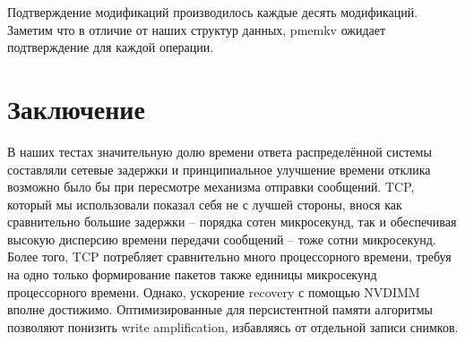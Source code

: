 \documentclass[pdftex,ptm,12pt,a4paper]{report}
\theoremstyle{definition}
\begin{document}
Подтверждение модификаций производилось каждые десять модификаций. Заметим что в отличие от наших структур данных, pmemkv ожидает подтверждение для каждой операции.

\chapter{Заключение}
В наших тестах значительную долю времени ответа распределённой системы составляли сетевые задержки и принципиальное улучшение времени отклика возможно было бы при
пересмотре механизма отправки сообщений. TCP, который мы использовали показал себя не с лучшей стороны, внося как сравнительно большие задержки -- порядка сотен микросекунд, так
и обеспечивая высокую дисперсию времени передачи сообщений -- тоже сотни микросекунд. Более того, TCP потребляет сравнительно много процессорного времени, требуя на одно только
формирование пакетов также единицы микросекунд процессорного времени. Однако, ускорение recovery с помощью NVDIMM вполне достижимо.
Оптимизированные для персистентной памяти алгоритмы позволяют понизить write amplification, избавляясь от отдельной записи снимков.




\end{document}
